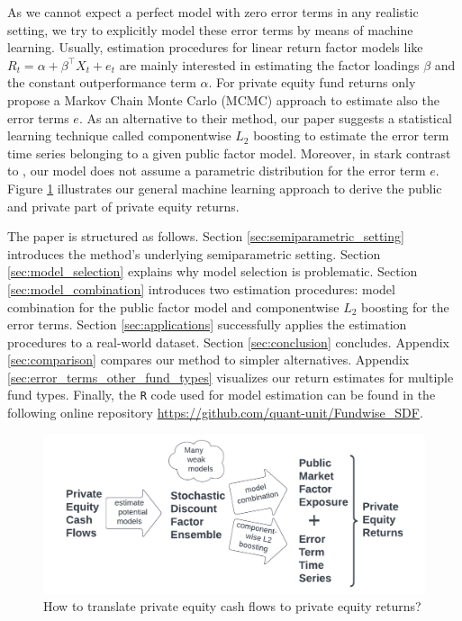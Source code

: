 \documentclass[12pt]{article}
\begin{document}
As we cannot expect a perfect model with zero error terms in any realistic setting, we try to explicitly model these error terms by means of machine learning.
Usually, estimation procedures for linear return factor models like $R_t= \alpha + \beta^{\top} X_t + e_t$ are mainly interested in estimating the factor loadings $\beta$ and the constant outperformance term $\alpha$.
For private equity fund returns only \cite{ACGP18} propose a Markov Chain Monte Carlo (MCMC) approach to estimate also the error terms $e$.
As an alternative to their method, our paper suggests a statistical learning technique called componentwise $L_2$ boosting to estimate the error term time series belonging to a given public factor model.
Moreover, in stark contrast to \cite{ACGP18}, our model does not assume a parametric distribution for the error term $e$.
Figure \ref{fig:how} illustrates our general machine learning approach to derive the public and private part of private equity returns.

The paper is structured as follows.
Section \ref{sec:semiparametric_setting} introduces the method's underlying semiparametric setting.
Section \ref{sec:model_selection} explains why model selection is problematic.
Section \ref{sec:model_combination} introduces two estimation procedures: model combination for the public factor model and componentwise $L_2$ boosting for the error terms.
Section \ref{sec:applications} successfully applies the estimation procedures to a real-world dataset.
Section \ref{sec:conclusion} concludes.
Appendix \ref{sec:comparison} compares our method to simpler alternatives. 
Appendix \ref{sec:error_terms_other_fund_types} visualizes our return estimates for multiple fund types.
Finally, the \texttt{R} code used for model estimation can be found in the following online repository \url{https://github.com/quant-unit/Fundwise_SDF}.

\begin{figure}[ht]
	\centering
	\includegraphics[width=14cm]{FlowChart/MLPER}
	\caption{How to translate private equity cash flows to private equity returns?}
	\label{fig:how}
\end{figure}
\end{document}
